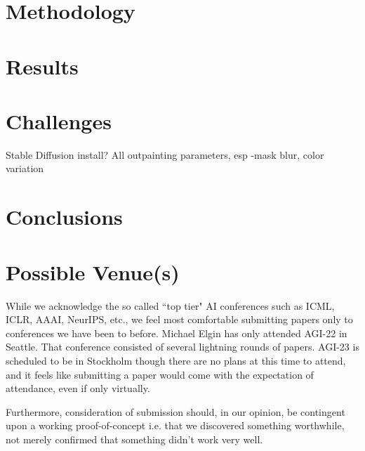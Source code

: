 \documentclass[conference]{IEEEtran}
\begin{document}
\section{Methodology}

\section{Results}

\section{Challenges}

Stable Diffusion install?
All outpainting parameters, esp
    -mask blur, color variation

\section{Conclusions}

\section{Possible Venue(s)}

While we acknowledge the so called ``top tier" AI conferences such as ICML, ICLR, AAAI, NeurIPS, etc., we feel most comfortable submitting papers only to conferences we have been to before. Michael Elgin has only attended AGI-22 in Seattle. That conference consisted of several lightning rounds of papers. AGI-23 is scheduled to be in Stockholm though there are no plans at this time to attend, and it feels like submitting a paper would come with the expectation of attendance, even if only virtually.

Furthermore, consideration of submission should, in our opinion, be contingent upon a working proof-of-concept i.e. that we discovered something worthwhile, not merely confirmed that something didn't work very well.

\end{document}
